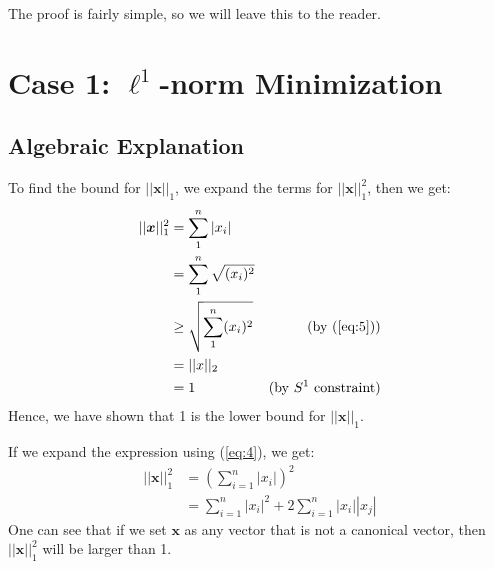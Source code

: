 \documentclass[11pt]{article}
\begin{document}
The proof is fairly simple, so we will leave this to the reader.


\section{Case 1: $\ell^1$-norm Minimization}

\subsection{Algebraic Explanation}
To find the bound for $||\bm{x}||_1$, we expand the terms for $||\bm{x}||_1^2$, then we get:
\begin{align*}
    ||\bm{x}||_1^2 
        &= \sum^n_1 |x_i| \\
        &= \sum^n_1 \sqrt{(x_i)^2} \\
        &\geq \sqrt{\sum^n_1 (x_i)^2} & \text{(by (\ref{eq:5}))}\\
        &= ||x||_2 \\
        &= 1 & \text{(by $S^1$ constraint)}
\end{align*}
Hence, we have shown that 1 is the lower bound for $||\bm{x}||_1$.

If we expand the expression using (\ref{eq:4}), we get:
\begin{align*}
    ||\bm{x}||_1^2
        &= (\sum^n_{i=1}|x_i|)^2 \\
        &= \sum^n_{i=1} |x_i|^2 + 2 \sum^n_{i=1}|x_i||x_j|
\end{align*}
One can see that if we set $\bm{x}$ as any vector that is not a canonical vector, then $||\bm{x}||_1^2$ will be larger than 1. 
\end{document}
